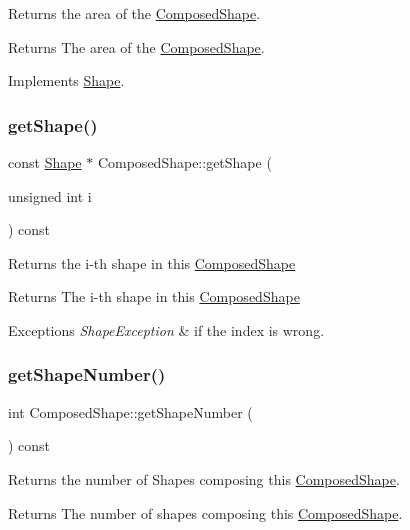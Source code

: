 Returns the area of the \hyperlink{class_composed_shape}{Composed\+Shape}. \begin{DoxyReturn}{Returns}
The area of the \hyperlink{class_composed_shape}{Composed\+Shape}. 
\end{DoxyReturn}


Implements \hyperlink{class_shape_ad9454ee04617290547e7529180b1beae}{Shape}.

\hypertarget{class_composed_shape_a144d7d70317e5123f081d36689254ea8}{}\label{class_composed_shape_a144d7d70317e5123f081d36689254ea8} 
\subsubsection{\texorpdfstring{get\+Shape()}{getShape()}}
{\footnotesize\ttfamily const \hyperlink{class_shape}{Shape} $\ast$ Composed\+Shape\+::get\+Shape (\begin{DoxyParamCaption}\item[{unsigned int}]{i }\end{DoxyParamCaption}) const}

Returns the i-\/th shape in this \hyperlink{class_composed_shape}{Composed\+Shape} \begin{DoxyReturn}{Returns}
The i-\/th shape in this \hyperlink{class_composed_shape}{Composed\+Shape} 
\end{DoxyReturn}

\begin{DoxyExceptions}{Exceptions}
{\em Shape\+Exception} & if the index is wrong. \\
\hline
\end{DoxyExceptions}
\hypertarget{class_composed_shape_ab33696ffeb5f3840cf0c5b75c8911787}{}\label{class_composed_shape_ab33696ffeb5f3840cf0c5b75c8911787} 
\subsubsection{\texorpdfstring{get\+Shape\+Number()}{getShapeNumber()}}
{\footnotesize\ttfamily int Composed\+Shape\+::get\+Shape\+Number (\begin{DoxyParamCaption}{ }\end{DoxyParamCaption}) const}

Returns the number of Shapes composing this \hyperlink{class_composed_shape}{Composed\+Shape}. \begin{DoxyReturn}{Returns}
The number of shapes composing this \hyperlink{class_composed_shape}{Composed\+Shape}. 
\end{DoxyReturn}
\hypertarget{class_composed_shape_acff645310f05924aaf66b0de71b2307a}{}\label{class_composed_shape_acff645310f05924aaf66b0de71b2307a} 
